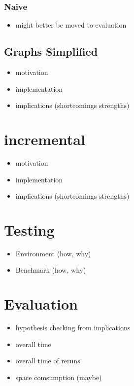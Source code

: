 \documentclass{llncs}
\begin{document}
\begin{multicols*}{2}
\subsubsection*{Naive}
\begin{itemize}
    \item might better be moved to evaluation
\end{itemize}
\color{black}

\subsection{Graphs Simplified}
\begin{itemize}
    \item motivation
    \item implementation
    \item implications (shortcomings strengths)
\end{itemize}

\color{blue}
\section{incremental}
\begin{itemize}
    \item motivation
    \item implementation
    \item implications (shortcomings strengths)
\end{itemize}
\color{black}

\color{blue}
\section{Testing}
\begin{itemize}
    \item Environment (how, why)
    \item Benchmark (how, why)
\end{itemize}
\color{black}

\section{Evaluation}
\begin{itemize}
    \item hypothesis checking from implications
    \item overall time
    \item overall time of reruns
    \item space comsumption (maybe)
\end{itemize}
    



\end{multicols*}
\end{document}
